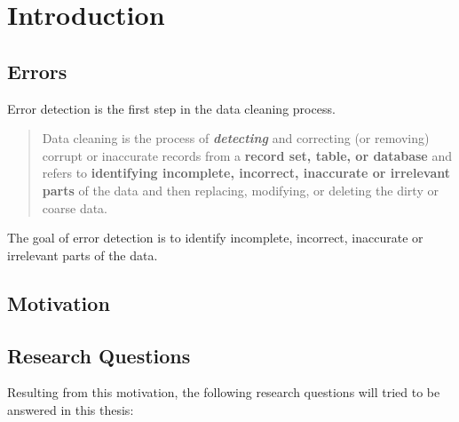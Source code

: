 \chapter{Introduction}
\label{chap:introduction}


\section{Errors}
\label{sec:errors}
Error detection is the first step in the data cleaning process.

\blockquote{Data cleaning is the process of \textbf{\textit{detecting}} and correcting (or removing) corrupt or inaccurate records from a \textbf{record set, table, or database} and refers to \textbf{identifying incomplete, incorrect, inaccurate or irrelevant parts} of the data and then replacing, modifying, or deleting the dirty or coarse data.}

The goal of error detection is to identify incomplete, incorrect, inaccurate or irrelevant parts of the data. 



\section{Motivation}
\label{sec:motivation}







\section{Research Questions}
\label{sec:researchquestions}
Resulting from this motivation, the following research questions will tried to be answered in this thesis:

